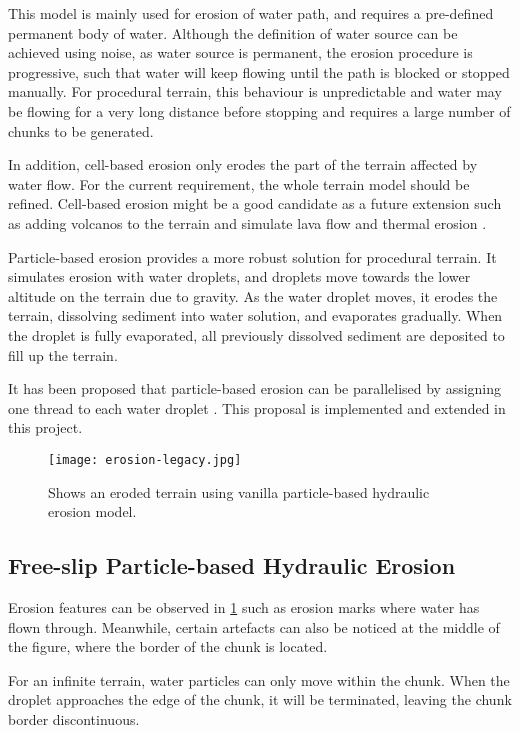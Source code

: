 \documentclass[oneside, a4paper]{report}
\begin{document}
    This model is mainly used for erosion of water path, and requires a pre-defined permanent body of water. Although the definition of water source can be achieved using noise, as water source is permanent, the erosion procedure is progressive, such that water will keep flowing until the path is blocked or stopped manually. For procedural terrain, this behaviour is unpredictable and water may be flowing for a very long distance before stopping and requires a large number of chunks to be generated.
    
    In addition, cell-based erosion only erodes the part of the terrain affected by water flow. For the current requirement, the whole terrain model should be refined. Cell-based erosion might be a good candidate as a future extension such as adding volcanos to the terrain and simulate lava flow and thermal erosion \cite{thermal_erosion}.

    Particle-based erosion provides a more robust solution for procedural terrain. It simulates erosion with water droplets, and droplets move towards the lower altitude on the terrain due to gravity. As the water droplet moves, it erodes the terrain, dissolving sediment into water solution, and evaporates gradually. When the droplet is fully evaporated, all previously dissolved sediment are deposited to fill up the terrain.

    It has been proposed that particle-based erosion can be parallelised by assigning one thread to each water droplet \cite{parameter_particle_based}. This proposal is implemented and extended in this project.

    \begin{figure}[H]
        \texttt{[image: erosion-legacy.jpg]}
        \caption{Shows an eroded terrain using vanilla particle-based hydraulic erosion model.}
        \label{vanilla_particle_erosion}
    \end{figure}

    \subsection{Free-slip Particle-based Hydraulic Erosion}

    Erosion features can be observed in \ref{vanilla_particle_erosion} such as erosion marks where water has flown through. Meanwhile, certain artefacts can also be noticed at the middle of the figure, where the border of the chunk is located.

    For an infinite terrain, water particles can only move within the chunk. When the droplet approaches the edge of the chunk, it will be terminated, leaving the chunk border discontinuous.
\end{document}
